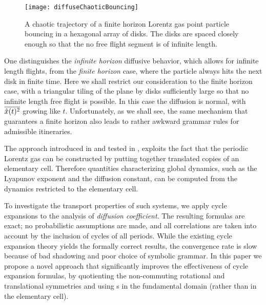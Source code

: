 \begin{figure}[htbp]
	\begin{center}
		\texttt{[image: diffuseChaoticBouncing]}
	\end{center}
	\caption[]{\label{fig-chaoticBouncing}
		A chaotic trajectory of a finite horizon Lorentz gas
		point particle bouncing in a
		hexagonal array of disks. The disks are spaced closely enough
		so that the no free flight segment is of infinite length.
	}
\end{figure}

One distinguishes
the {\em infinite horizon} diffusive behavior, which allows for infinite
length flights, from
the {\em finite horizon} case, where the particle always
hits the next disk in finite time.
Here we shall restrict our consideration to the finite horizon case, with
a triangular tiling of the plane by disks sufficiently large so that no
infinite length free flight is possible. In this case the diffusion is
normal, with $\overline{\hat{x}(t)^2}$ growing like $t$.
Unfortunately, as we shall see,
the same mechanism that guarantees a finite horizon
also leads to rather awkward grammar rules for admissible itineraries.


The approach introduced in  and tested in
, exploits the fact that the periodic Lorentz gas can be
constructed by putting together translated copies of an elementary cell.
Therefore quantities characterizing global dynamics, such as the Lyapunov
exponent and the diffusion constant, can be computed from the dynamics
restricted to the elementary cell.

To investigate the transport properties of such systems, we apply cycle
expansions to the analysis of {\em diffusion coefficient}.
The resulting formulas are exact; no probabilistic assumptions are made,
and all correlations are taken into account by the  inclusion of cycles
of all periods. While the existing cycle expansion theory yields the
formally correct
results, the convergence
rate is slow because of bad shadowing and poor choice of symbolic
grammar. In this paper we propose a novel approach that
significantly improves the effectiveness of cycle expansion formulas, by
quotienting the non-commuting rotational and translational symmetries and
using \po s in the fundamental domain (rather than in the elementary cell).


